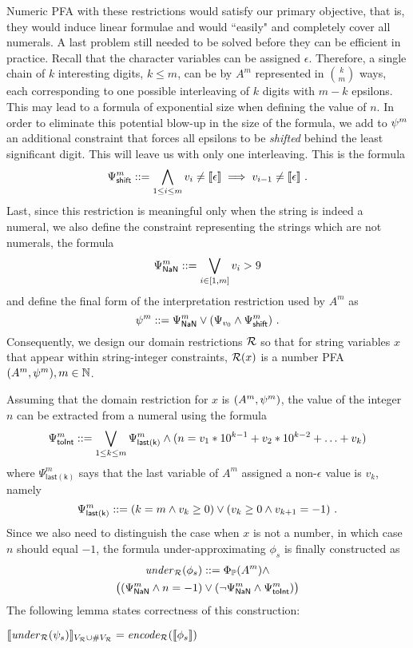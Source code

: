 \documentclass[sigplan,review,anonymous]{acmart}\settopmatter{printfolios=true,printccs=false,printacmref=false}
\begin{document}
Numeric PFA with these restrictions would satisfy our primary objective, that is, they would induce linear formulae and would ``easily" and completely cover all numerals.
%
A last problem still needed to be solved before they can be efficient in practice. 
%
Recall that the character variables can be assigned $\epsilon$.  
%
Therefore, a single chain of $k$ interesting digits, $k\leq m$, can be by $A^m$ represented in $k\choose m$ ways, each corresponding to one possible interleaving of $k$ digits with $m-k$ epsilons. 
%
%
This may  lead to a formula of   exponential size  when defining  the value of $n$.
%
In order to eliminate this potential blow-up in the size of the formula, we add to $\psi^m$ an additional constraint that forces all epsilons to be \emph{shifted} behind the least significant digit. This will leave us with only one interleaving. This is the formula
$$
\Psi_{\mathsf{shift}}^m ::= \bigwedge_{1\leq i \leq m} v_i \neq [\![\epsilon]\!] \implies v_{i-1}\neq [\![\epsilon]\!] \ .
$$
Last, since this restriction is meaningful only when the string is indeed a numeral,  
we also define the constraint representing the strings which are not numerals, the formula
$$
\Psi_{\mathsf{NaN}}^m ::=  \bigvee_{i\in [1,m]} v_i>9
$$ 
and define the final form of the interpretation restriction used by $A^m$ as 
$$
\psi^m ::=  \Psi_{\mathsf{NaN}}^m \lor (\Psi_{v_0} \land \Psi_{\mathsf{shift}}^m)\ .
$$
Consequently, we design our domain restrictions $\mathcal{R}$ so that for string variables $x$ that appear within string-integer constraints,  $\mathcal{R}(x)$ is a number PFA $(A^m,\psi^m),m\in \mathbb{N}$. 

Assuming that the domain restriction for $x$ is $(A^m,\psi^m)$, 
the value of the integer $n$ can be extracted from a numeral using the formula
$$
\Psi_{\mathsf{toInt}}^m::= \bigvee_{1\leq k \leq m} \Psi_{\mathsf{last(k)}}^m \land (n = v_1* 10^{k-1} + v_2* 10^{k-2} + \ldots + v_{k})
$$
where $\Psi_{\mathsf{last(k)}}^m$ says that the last variable of $A^m$ assigned a non-$\epsilon$ value is $v_{k}$, namely 
$$
\Psi_{\mathsf{last(k)}}^m ::= (k = m \land v_k \geq 0) \lor (v_{k} \geq 0 \land v_{k+1} = -1)\ .
$$
Since we also need to distinguish the case when $x$ is not a number, in which case $n$ should equal $-1$, 
the formula under-approximating $\phi_s$ is finally constructed as  
\begin{multline*}
\mathit{under}_{\mathcal{R}}(\phi_s) 
::= 
\Phi_{\mathbb{P}}(A^m) 
\land \\
\bigl((\Psi_{\mathsf{NaN}}^m \land n = -1) 
\lor 
(\neg\Psi_{\mathsf{NaN}}^m \land \Psi_{\mathsf{toInt}}^m)\bigr)
\end{multline*}
The following lemma states correctness of this construction:
\begin{lemma}
$
[\![\mathit{under}_{\mathcal{R}}(\psi_s) ]\!]_{V_{\mathcal{R}} \cup \#V_{\mathcal{R}}} = \mathit{encode}_{\mathcal{R}}([\![\phi_s]\!])
$
\end{lemma}
\end{document}
